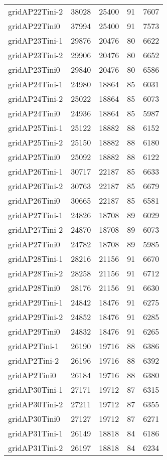 \begin{longtable}{lrrrr}
gridAP22Tini-2 & 38028 & 25400 & 91 & 7607 \\
gridAP22Tini0 & 37994 & 25400 & 91 & 7573 \\
gridAP23Tini-1 & 29876 & 20476 & 80 & 6622 \\
gridAP23Tini-2 & 29906 & 20476 & 80 & 6652 \\
gridAP23Tini0 & 29840 & 20476 & 80 & 6586 \\
gridAP24Tini-1 & 24980 & 18864 & 85 & 6031 \\
gridAP24Tini-2 & 25022 & 18864 & 85 & 6073 \\
gridAP24Tini0 & 24936 & 18864 & 85 & 5987 \\
gridAP25Tini-1 & 25122 & 18882 & 88 & 6152 \\
gridAP25Tini-2 & 25150 & 18882 & 88 & 6180 \\
gridAP25Tini0 & 25092 & 18882 & 88 & 6122 \\
gridAP26Tini-1 & 30717 & 22187 & 85 & 6633 \\
gridAP26Tini-2 & 30763 & 22187 & 85 & 6679 \\
gridAP26Tini0 & 30665 & 22187 & 85 & 6581 \\
gridAP27Tini-1 & 24826 & 18708 & 89 & 6029 \\
gridAP27Tini-2 & 24870 & 18708 & 89 & 6073 \\
gridAP27Tini0 & 24782 & 18708 & 89 & 5985 \\
gridAP28Tini-1 & 28216 & 21156 & 91 & 6670 \\
gridAP28Tini-2 & 28258 & 21156 & 91 & 6712 \\
gridAP28Tini0 & 28176 & 21156 & 91 & 6630 \\
gridAP29Tini-1 & 24842 & 18476 & 91 & 6275 \\
gridAP29Tini-2 & 24852 & 18476 & 91 & 6285 \\
gridAP29Tini0 & 24832 & 18476 & 91 & 6265 \\
gridAP2Tini-1 & 26190 & 19716 & 88 & 6386 \\
gridAP2Tini-2 & 26196 & 19716 & 88 & 6392 \\
gridAP2Tini0 & 26184 & 19716 & 88 & 6380 \\
gridAP30Tini-1 & 27171 & 19712 & 87 & 6315 \\
gridAP30Tini-2 & 27211 & 19712 & 87 & 6355 \\
gridAP30Tini0 & 27127 & 19712 & 87 & 6271 \\
gridAP31Tini-1 & 26149 & 18818 & 84 & 6186 \\
gridAP31Tini-2 & 26197 & 18818 & 84 & 6234 \\

\end{longtable}
